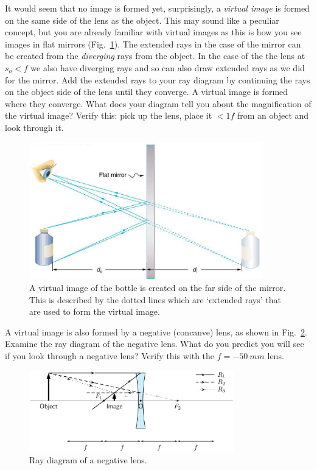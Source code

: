 \documentclass[a4paper]{report}
\begin{document}
It would seem that no image is formed yet, surprisingly, a \textit{virtual image} is formed on the same side of the lens as the object. 
This may sound like a peculiar concept, but you are already familiar with virtual images as this is how you see images in flat mirrors (Fig.~\ref{fig:mirror}). 
The extended rays in the case of the mirror can be created from the \textit{diverging} rays from the object. 
In the case of the the lens at $s_o<f$ we also have diverging rays and so can also draw extended rays as we did for the mirror. 
Add the extended rays to your ray diagram by continuing the rays on the object side of the lens until they converge. 
A virtual image is formed where they converge.
What does your diagram tell you about the magnification of the virtual image?
Verify this: pick up the lens, place it $<1f$ from an object and look through it.
\begin{figure}[h]
\center
\includegraphics[width=4in]{virtual_image_mirr.eps}
\caption{A virtual image of the bottle is created on the far side of the mirror. 
This is described by the dotted lines which are `extended rays' that are used to form the virtual image. }
\label{fig:mirror}
\end{figure}

A virtual image is also formed by a negative (concanve) lens, as shown in Fig.~\ref{fig:neglens}. 
Examine the ray diagram of the negative lens. 
What do you predict you will see if you look through a negative lens?
Verify this with the $f=-50~mm$ lens.
\begin{figure}[h]
\center
\includegraphics[width=3.5in]{negative_lens.eps}
\caption{Ray diagram of a negative lens.}
\label{fig:neglens}
\end{figure}
\end{document}
